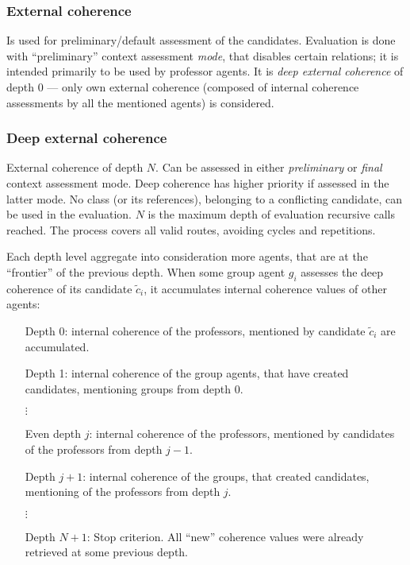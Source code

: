 \documentclass[../../ThesisDoc]{subfiles}
\begin{document}

\subsubsection{External coherence}
Is used for preliminary/default assessment of the candidates.
Evaluation is done with ``preliminary'' context assessment \emph{mode}, that
disables certain relations; it is intended primarily to be used by professor agents.
It is \emph{deep external coherence} of depth 0 --- only own external coherence
(composed of internal coherence assessments by all the mentioned agents) is
considered.



\subsubsection{Deep external coherence}
External coherence of depth $N$. Can be assessed in either \emph{preliminary}
or \emph{final} context assessment mode. Deep coherence has higher priority if
assessed in the latter mode.
No class (or its references), belonging to a conflicting candidate, can be used in
the evaluation.
$N$ is the maximum depth of evaluation recursive calls reached.
The process covers all valid routes, avoiding cycles and repetitions.

Each depth level aggregate into consideration more agents, that are at the
``frontier'' of the previous depth. When some group agent $g_i$ assesses the
deep coherence of its candidate $\tilde{c}_i$, it accumulates internal
coherence values of other agents:
\begin{itemize}[leftmargin=2.5cm]
  \item[Depth 0:] internal coherence of the professors,
            mentioned by candidate $\tilde{c}_i$ are accumulated.
  \item[Depth 1:] internal coherence of the group agents,
            that have created candidates, mentioning groups from depth 0.
  \item[$\vdots$]
  \item[Even depth $j$:] internal coherence of the professors,
            mentioned by candidates of the professors from depth $j-1$.
  \item[Depth $j+1$:] internal coherence of the groups,
            that created candidates, mentioning of the professors from depth $j$.
  \item[$\vdots$]
  \item[Depth $N+1$:] Stop criterion.
            All ``new'' coherence values were already retrieved at some previous depth.
\end{itemize}
\end{document}
